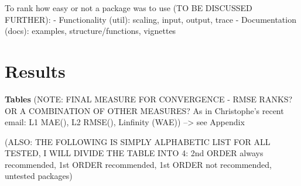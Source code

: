 To rank how easy or not a package was to use (TO BE DISCUSSED FURTHER):
- Functionality (util): scaling, input, output, trace - Documentation
(docs): examples, structure/functions, vignettes

\hypertarget{results}{%
\section{Results}\label{results}}

\textbf{Tables} (NOTE: FINAL MEASURE FOR CONVERGENCE - RMSE RANKS? OR A
COMBINATION OF OTHER MEASURES? As in Christophe's recent email: L1
MAE(), L2 RMSE(), Linfinity (WAE)) --\textgreater{} see Appendix

(ALSO: THE FOLLOWING IS SIMPLY ALPHABETIC LIST FOR ALL TESTED, I WILL
DIVIDE THE TABLE INTO 4: 2nd ORDER always recommended, 1st ORDER
recommended, 1st ORDER not recommended, untested packages)

